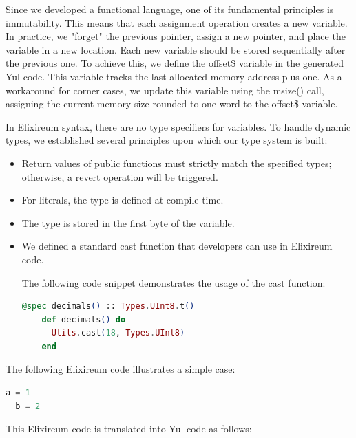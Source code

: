Since we developed a functional language, one of its fundamental principles is immutability. This means that each assignment operation creates a new variable. In practice, we "forget" the previous pointer, assign a new pointer, and place the variable in a new location. Each new variable should be stored sequentially after the previous one. To achieve this, we define the offset\$ variable in the generated Yul code. This variable tracks the last allocated memory address plus one. As a workaround for corner cases, we update this variable using the msize() call, assigning the current memory size rounded to one word to the offset\$ variable.

In Elixireum syntax, there are no type specifiers for variables. To handle dynamic types, we established several principles upon which our type system is built:
\begin{itemize}
  \item Return values of public functions must strictly match the specified types; otherwise, a revert operation will be triggered.
  \item For literals, the type is defined at compile time.
  \item The type is stored in the first byte of the variable.
  \item We defined a standard cast function that developers can use in Elixireum code.

  The following code snippet demonstrates the usage of the cast function:
  \begin{lstlisting}[caption={Example of cast function usage}, language=elixir, label={lst:contract_structure}]
    @spec decimals() :: Types.UInt8.t()
    def decimals() do
      Utils.cast(18, Types.UInt8)
    end  
  \end{lstlisting}
\end{itemize}

The following Elixireum code illustrates a simple case:

\begin{lstlisting}[caption={Elixireum code for simple case}, language=elixir]
  a = 1
  b = 2
\end{lstlisting}

This Elixireum code is translated into Yul code as follows:

